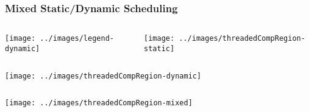 \begin{frame}[label=mixedstatdyn]
\frametitle{Mixed Static/Dynamic Scheduling}
\begin{columns}
  
  \texttt{[image: ../images/legend-dynamic]}\\
  \begin{center}
    \texttt{[image: ../images/threadedCompRegion-static]} \\
  \end{center}
\end{columns}
\begin{columns}

  \begin{center}
    \texttt{[image: ../images/threadedCompRegion-dynamic]}\\
  \end{center}
\end{columns}
\begin{columns}

\begin{center}
\texttt{[image: ../images/threadedCompRegion-mixed]}
\end{center}
\end{columns}
\end{frame}

